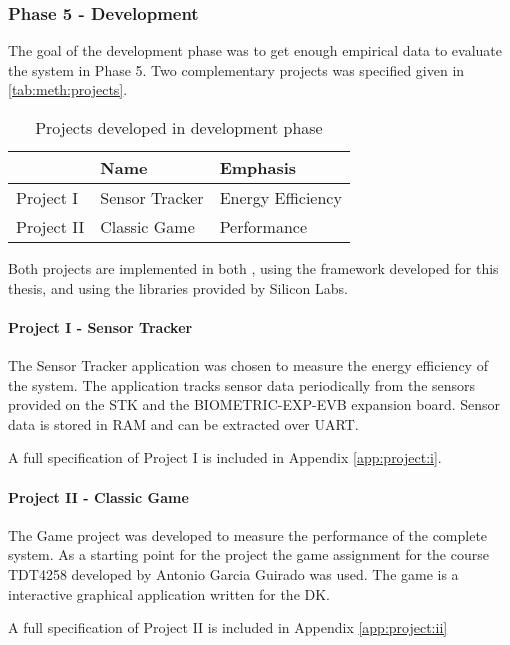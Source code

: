 \subsubsection{Phase 5 - Development}
\label{sec:projects}

The goal of the development phase was to get enough empirical data to evaluate the system in Phase 5.
Two complementary projects was specified given in \autoref{tab:meth:projects}.

\begin{table}[H]
  \begin{tabular}{|l|l|l|}
    \hline
    & Name & Emphasis \\
    \hline
    \hline
    Project I & Sensor Tracker & Energy Efficiency \\
    \hline
    Project II & Classic Game & Performance \\
    \hline
  \end{tabular}
  \caption{Projects developed in development phase}
  \label{tab:meth:projects}
\end{table}

Both projects are implemented in both {\rust}, using the framework developed for this thesis, and {\C} using the libraries provided by Silicon Labs.

\paragraph{Project I - Sensor Tracker}
The Sensor Tracker application was chosen to measure the energy efficiency of the system.
The application tracks sensor data periodically from the sensors provided on the STK and the BIOMETRIC-EXP-EVB expansion board.
Sensor data is stored in RAM and can be extracted over UART.

A full specification of Project I is included in Appendix \autoref{app:project:i}.

\paragraph{Project II - Classic Game}
The Game project was developed to measure the performance of the complete system.
As a starting point for the project the game assignment for the course TDT4258 developed by Antonio Garcia Guirado was used.
The game is a interactive graphical application written for the DK.

A full specification of Project II is included in Appendix \autoref{app:project:ii}

